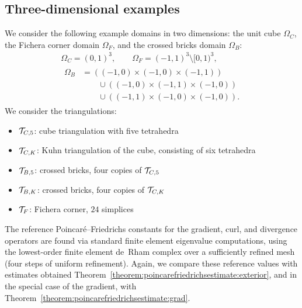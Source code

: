 \documentclass[10pt,a4paper]{article}
\begin{document}
\subsection{Three-dimensional examples}

We consider the following example domains in two dimensions:
the unit cube $\Omega_C$, the Fichera corner domain $\Omega_F$, and the crossed bricks domain $\Omega_{B}$:
\begin{gather*}
    \Omega_{C}  = ( 0,1)^3,
    \qquad 
    \Omega_{F}  = (-1,1)^3 \setminus [0,1)^3,
    \\
    \begin{aligned}
    \Omega_{B} &= 
    \left( (-1,0) \times (-1,0) \times (-1,1) \right)
    \\&\qquad
    \cup 
    \left( (-1,0) \times (-1,1) \times (-1,0) \right)
    \\&\qquad
    \cup 
    \left( (-1,1) \times (-1,0) \times (-1,0) \right)
    .
    \end{aligned}
\end{gather*}
We consider the triangulations: 
\begin{itemize}
    \item ${\mathcal T}_{C,5}$: cube triangulation with five tetrahedra
    \item ${\mathcal T}_{C,K}$: Kuhn triangulation of the cube, consisting of six tetrahedra
    \item ${\mathcal T}_{B,5}$: crossed bricks, four copies of ${\mathcal T}_{C,5}$
    \item ${\mathcal T}_{B,K}$: crossed bricks, four copies of ${\mathcal T}_{C,K}$
    \item ${\mathcal T}_{F}$: Fichera corner, $24$ simplices 
\end{itemize}

The reference Poincar\'e--Friedrichs constants for the gradient, curl, and divergence operators are found via standard finite element eigenvalue computations, using the lowest-order finite element de~Rham complex over a sufficiently refined mesh (four steps of uniform refinement).
Again, we compare these reference values with estimates obtained Theorem~\ref{theorem:poincarefriedrichsestimate:exterior}, and in the special case of the gradient, with Theorem~\ref{theorem:poincarefriedrichsestimate:grad}.

\end{document}
